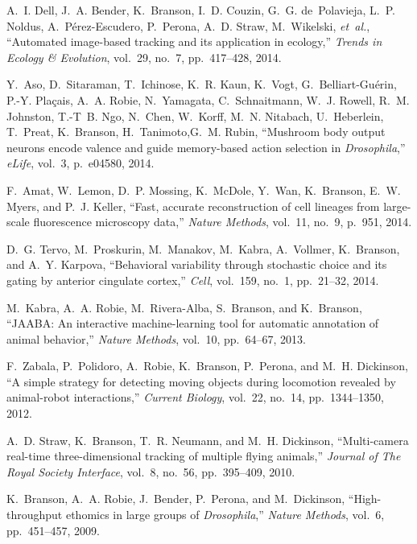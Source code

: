 \begin{cvenum}
\item A.~I. Dell, J.~A. Bender, K.~Branson, I.~D. Couzin, G.~G. de~Polavieja, L.~P.
  Noldus, A.~P{\'e}rez-Escudero, P.~Perona, A.~D. Straw, M.~Wikelski, {\em
  et~al.}, ``Automated image-based tracking and its application in ecology,''
  {\em Trends in Ecology \& Evolution}, vol.~29, no.~7, pp.~417--428, 2014.

  \item Y.~Aso, D.~Sitaraman, T.~Ichinose, K.~R. Kaun, K.~Vogt, G.~Belliart-Gu{\'e}rin, P.-Y. Pla{\c{c}}ais, A.~A. Robie, N.~Yamagata, C.~Schnaitmann, W.~J. Rowell, R.~M. Johnston, T.-T~B. Ngo, N.~Chen, W.~Korff, M.~N. Nitabach, U.~Heberlein, T.~Preat, K.~Branson, H.~Tanimoto,G.~M. Rubin,  ``Mushroom body output neurons encode valence and guide memory-based action selection in {\em {{D}}rosophila},'' {\em eLife}, vol.~3, p.~e04580, 2014.

\item F.~Amat, W.~Lemon, D.~P. Mossing, K.~McDole, Y.~Wan, K.~Branson, E.~W. Myers,
  and P.~J. Keller, ``Fast, accurate reconstruction of cell lineages from
  large-scale fluorescence microscopy data,'' {\em Nature Methods}, vol.~11,
  no.~9, p.~951, 2014.

\item D.~G. Tervo, M.~Proskurin, M.~Manakov, M.~Kabra, A.~Vollmer, K.~Branson, and
  A.~Y. Karpova, ``Behavioral variability through stochastic choice and its
  gating by anterior cingulate cortex,'' {\em Cell}, vol.~159, no.~1,
  pp.~21--32, 2014.
  
\item M.~Kabra, A.~A. Robie, M.~Rivera-Alba, S.~Branson, and K.~Branson, ``{{JAABA}}:
  An interactive machine-learning tool for automatic annotation of animal
  behavior,'' {\em Nature Methods}, vol.~10, pp.~64--67, 2013.

\item F.~Zabala, P.~Polidoro, A.~Robie, K.~Branson, P.~Perona, and M.~H. Dickinson,
  ``A simple strategy for detecting moving objects during locomotion revealed
  by animal-robot interactions,'' {\em Current Biology}, vol.~22, no.~14,
  pp.~1344--1350, 2012.

\item A.~D. Straw, K.~Branson, T.~R. Neumann, and M.~H. Dickinson, ``Multi-camera
  real-time three-dimensional tracking of multiple flying animals,'' {\em
  Journal of The Royal Society Interface}, vol.~8, no.~56, pp.~395--409, 2010.

\item K.~Branson, A.~A. Robie, J.~Bender, P.~Perona, and M.~Dickinson,
  ``High-throughput ethomics in large groups of \emph{{D}rosophila},'' {\em
  Nature Methods}, vol.~6, pp.~451--457, 2009.


\end{cvenum}
